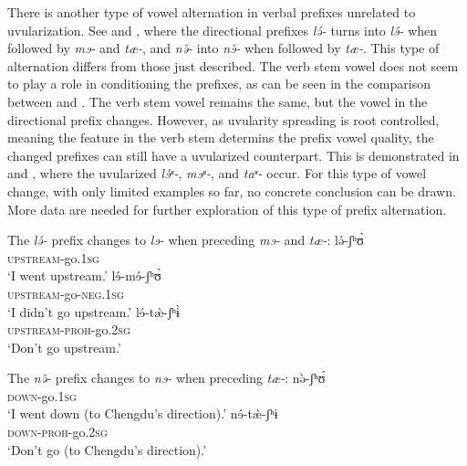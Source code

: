 \documentclass[output=paper]{langscibook}
\begin{document}
There is another type of vowel alternation in verbal prefixes unrelated to uvularization. See  and , where the directional prefixes \textit{lə́-} turns into \textit{lɘ́-} when followed by \textit{mɘ-} and \textit{tæ-}, and \textit{nə̌-} into \textit{nɘ̌-} when followed by \textit{tæ-}. This type of alternation differs from those just described. The verb stem vowel does not seem to play a role in conditioning the prefixes, as can be seen in the comparison between  and . The verb stem vowel remains the same, but the vowel in the directional prefix changes. However, as uvularity spreading is root controlled, meaning the feature in the verb stem determins the prefix vowel quality, the changed prefixes can still have a uvularized counterpart. This is demonstrated in  and , where the uvularized \textit{lɘ́ʶ-}, \textit{mɘʶ-}, and \textit{taʶ-} occur. For this type of vowel change, with only limited examples so far, no concrete conclusion can be drawn. More data are needed for further exploration of this type of prefix alternation. 

\ea%
The \textit{lə́-} prefix changes to \textit{lɘ-} when preceding \textit{mɘ-} and \textit{tæ-}:
    \label{ex:guan:8}
    \ea \label{ex:guan:8a}
        \gll lə́-ʃʰʊ̀\\
        \textsc{upstream}{}-go.1\textsc{sg}\\
        \glt  ‘I went upstream.’
    \ex \label{ex:guan:8b}
        \gll lɘ́-mɘ́-ʃʰʊ̀\\
        \textsc{upstream}{}-go-\textsc{neg}.1\textsc{sg}\\
        \glt  ‘I didn’t go upstream.’
    \ex \label{ex:guan:8c}
        \gll lɘ́-tæ̀-ʃʰɨ̀\\
        \textsc{upstream}-\textsc{proh}-go.2\textsc{sg}\\
        \glt  ‘Don’t go upstream.’
        \z
    \z
        
\ea%
The \textit{nə̌-} prefix changes to \textit{nɘ-} when preceding \textit{tæ-}:
    \label{ex:guan:9}
    \ea \label{ex:guan:9a}
        \gll nə̀-ʃʰʊ́\\
        \textsc{down}{}-go.1\textsc{sg}\\
        \glt  ‘I went down (to Chengdu’s direction).’
    \ex \label{ex:guan:9b}
        \gll nɘ́-tæ̀-ʃʰɨ\\
        \textsc{down}-\textsc{proh}-go.2\textsc{sg}\\
        \glt  ‘Don’t go (to Chengdu’s direction).’
        \z
        \z
\end{document}

